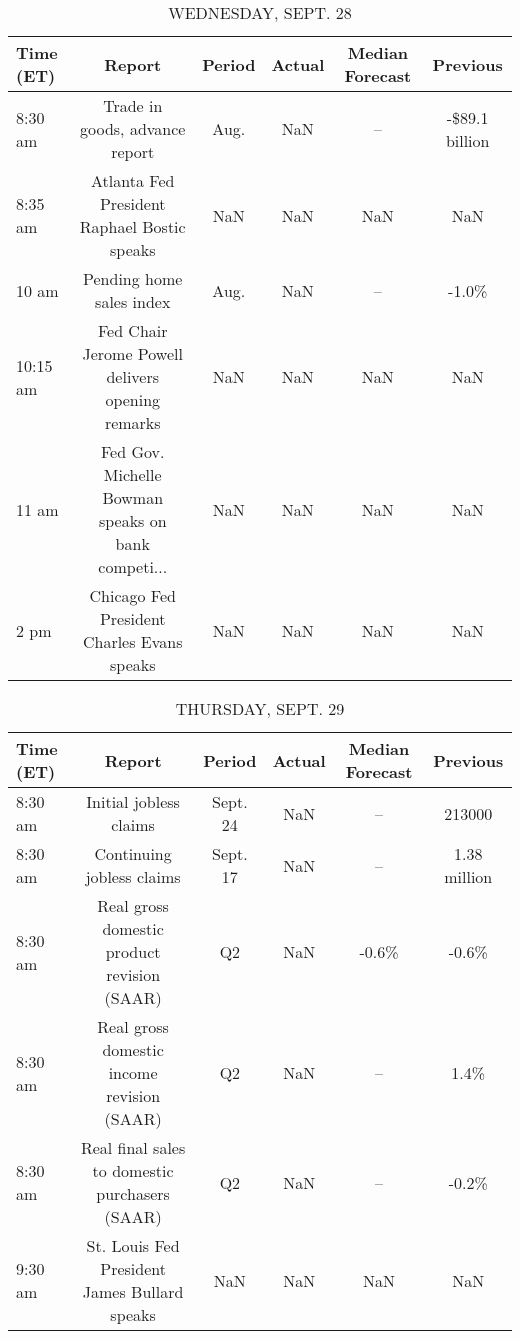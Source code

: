 \documentclass{article}%
\begin{document}
\begin{table}[htbp]%
\caption{WEDNESDAY, SEPT. 28}%
\centering%
\begin{adjustbox}{width=1\textwidth}%
\begin{tabular}{lccccc}
\toprule
Time (ET) &                                             Report & Period & Actual & Median Forecast &       Previous \\
\midrule
  8:30 am &                     Trade in goods, advance report &   Aug. &    NaN &              -- & -\$89.1 billion \\
  8:35 am &        Atlanta Fed President Raphael Bostic speaks &    NaN &    NaN &             NaN &            NaN \\
    10 am &                           Pending home sales index &   Aug. &    NaN &              -- &          -1.0\% \\
 10:15 am &   Fed Chair Jerome Powell delivers opening remarks &    NaN &    NaN &             NaN &            NaN \\
    11 am & Fed Gov. Michelle Bowman speaks on bank competi... &    NaN &    NaN &             NaN &            NaN \\
     2 pm &         Chicago Fed President Charles Evans speaks &    NaN &    NaN &             NaN &            NaN \\
\bottomrule
\end{tabular}
%
\end{adjustbox}%
\end{table}

%


\begin{table}[htbp]%
\caption{THURSDAY, SEPT. 29}%
\centering%
\begin{adjustbox}{width=1\textwidth}%
\begin{tabular}{lccccc}
\toprule
Time (ET) &                                         Report &   Period & Actual & Median Forecast &     Previous \\
\midrule
  8:30 am &                         Initial jobless claims & Sept. 24 &    NaN &              -- &       213000 \\
  8:30 am &                      Continuing jobless claims & Sept. 17 &    NaN &              -- & 1.38 million \\
  8:30 am &    Real gross domestic product revision (SAAR) &       Q2 &    NaN &           -0.6\% &        -0.6\% \\
  8:30 am &     Real gross domestic income revision (SAAR) &       Q2 &    NaN &              -- &         1.4\% \\
  8:30 am & Real final sales to domestic purchasers (SAAR) &       Q2 &    NaN &              -- &        -0.2\% \\
  9:30 am &   St. Louis Fed President James Bullard speaks &      NaN &    NaN &             NaN &          NaN \\
\bottomrule
\end{tabular}
%
\end{adjustbox}%
\end{table}
\end{document}
